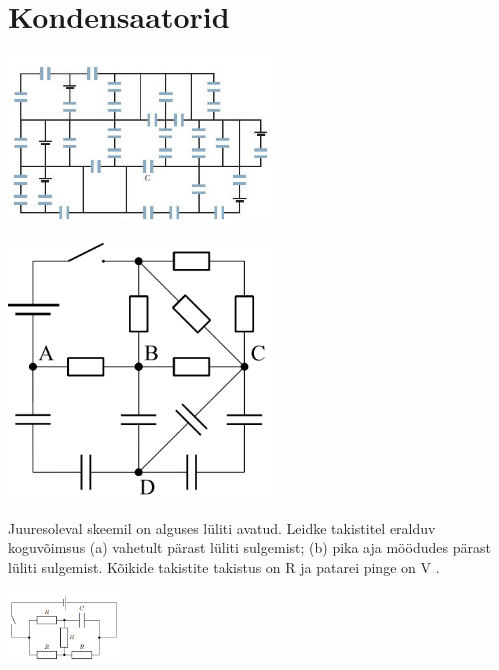 \documentclass{article}
\begin{document}
\section{Kondensaatorid}
\begin{center}
\includegraphics[width =  7cm]{ec1.jpg}
\end{center}
\begin{center}
\includegraphics[width =  7cm]{ec6.PNG}
\end{center}
Juuresoleval skeemil on alguses lüliti avatud. Leidke takistitel
eralduv koguvõimsus
(a) vahetult pärast lüliti sulgemist;
(b) pika aja möödudes pärast lüliti sulgemist.
Kõikide takistite takistus on R ja patarei pinge on V . 
\begin{center}
\includegraphics[width =  3cm]{cap1.PNG}
\end{center}
\end{document}
